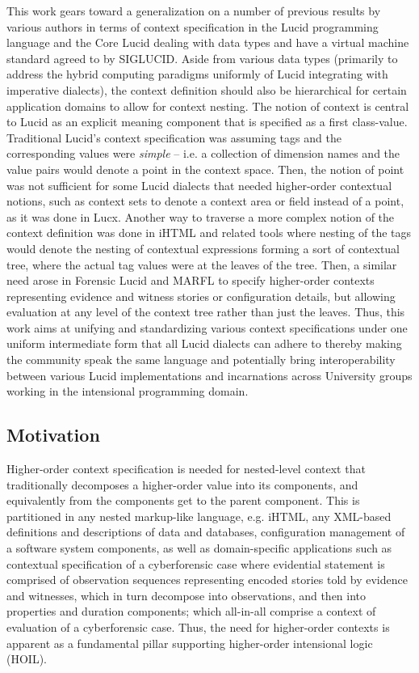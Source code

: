 \documentclass{easychair}
\newcommand{\lucid}{{Lucid\index{Lucid}}}
\newcommand{\flucid}{{Forensic Lucid\index{Forensic Lucid}}}
\newcommand{\lucx}{{Lucx\index{Lucx}}}
\newcommand{\marfl}{MARFL\index{MARFL}}
\begin{document}
This work gears toward a generalization on a number of previous results by various authors
in terms of context specification in the {\lucid} programming language and the Core Lucid
dealing with data types and have a virtual machine standard agreed to by SIGLUCID.
Aside from various data types (primarily to address the hybrid computing paradigms
uniformly of Lucid integrating with imperative dialects), the context definition should
also be hierarchical for certain application domains to allow for context nesting.
The notion of context is central to {\lucid} as an explicit meaning component
that is specified as a first class-value. Traditional {\lucid}'s context
specification was assuming tags and the corresponding values were
{\em simple} -- i.e. a collection of dimension names and the value pairs
would denote a point in the context space. Then, the notion of point
was not sufficient for some Lucid dialects that needed higher-order
contextual notions, such as context sets to denote a context area
or field instead of a point, as it was done in {\lucx}. Another way
to traverse a more complex notion of the context definition was
done in iHTML and related tools where nesting of the tags would
denote the nesting of contextual expressions forming a sort of
contextual tree, where the actual tag values were at the leaves
of the tree.  Then, a similar need arose in {\flucid} and {\marfl}
to specify higher-order contexts representing evidence and witness
stories or configuration details, but allowing evaluation at any level
of the context tree rather than just the leaves. Thus, this work aims at
unifying and standardizing various context specifications under one
uniform intermediate form that all Lucid dialects can adhere to
thereby making the community speak the same language and
potentially bring interoperability between various Lucid implementations
and incarnations across University groups working in the
intensional programming domain.


\subsection{Motivation}

Higher-order context specification is needed for nested-level
context that traditionally decomposes a higher-order value
into its components, and equivalently from the components
get to the parent component. This is partitioned in any
nested markup-like language, e.g. iHTML, any XML-based
definitions and descriptions of data and databases,
configuration management of a software system components,
as well as domain-specific applications such as contextual
specification of a cyberforensic case where evidential statement
is comprised of observation sequences representing encoded stories
told by evidence and witnesses, which in turn decompose into
observations, and then into properties and duration components;
which all-in-all comprise a context of evaluation of a cyberforensic
case. Thus, the need for higher-order contexts is apparent as
a fundamental pillar supporting higher-order intensional
logic (HOIL).
\end{document}
